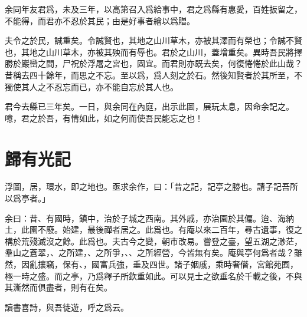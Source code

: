 余同年友君爲，未及三年，以高第召入爲給事中，君之爲縣有惠愛，百姓扳留之，不能得，而君亦不忍於其民；由是好事者繪以爲贈。

夫令之於民，誠重矣。令誠賢也，其地之山川草木，亦被其澤而有榮也；令誠不賢也，其地之山川草木，亦被其殃而有辱也。君於之山川，蓋增重矣。異時吾民將擇勝於巖巒之間，尸祝於浮屠之宮也，固宜。而君則亦既去矣，何復惓惓於此山哉？昔稱去四十餘年，而思之不忘。至以爲，爲人刻之於石。然後知賢者於其所至，不獨使其人之不忍忘而已，亦不能自忘於其人也。

君今去縣已三年矣。一日，與余同在內庭，出示此圖，展玩太息，因命余記之。噫，君之於吾，有情如此，如之何而使吾民能忘之也！

\section[滄浪亭記\quad{\small 歸有光}]{{\normalsize 歸有光}\quad {}記}
浮圖，居，環水，即之地也。亟求余作，曰：「昔之記，記亭之勝也。請子記吾所以爲亭者。」%

余曰：昔、有國時，鎮中，治於子城之西南。其外戚，亦治園於其偏。迨、{海}納土，此園不廢。始建，最後禪者居之。此爲也。有庵以來二百年，尋古遺事，復之構於荒殘滅沒之餘。此爲也。夫古今之變，朝市改易。嘗登之臺，望五湖之渺茫，羣山之蒼翠，、之所建，、之所爭，、、之所經營，今皆無有矣。庵與亭何爲者哉？雖然，因亂攘竊，保有、，國富兵強，垂及四世。諸子姻戚，乘時奢僭，宮館苑囿，極一時之盛。而之亭，乃爲釋子所欽重如此。可以見士之欲垂名於千載之後，不與其澌然而俱盡者，則有在矣。%

讀書喜詩，與吾徒遊，呼之爲云。

